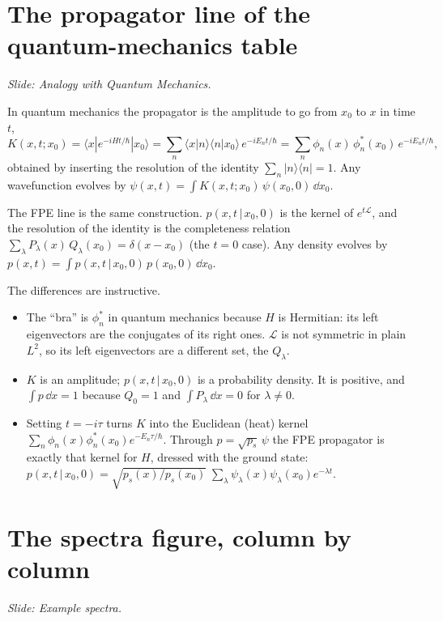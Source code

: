 \documentclass[11pt]{article}
\newcommand{\gv}{\,|\,}
\newcommand{\Lop}{\mathcal{L}}
\begin{document}
\section{The propagator line of the quantum-mechanics table}
\emph{Slide: Analogy with Quantum Mechanics.}

In quantum mechanics the propagator is the amplitude to go from $x_0$ to $x$ in time $t$,
\[
  K(x,t;x_0)=\langle x|e^{-iHt/\hbar}|x_0\rangle=\sum_n\langle x|n\rangle\langle n|x_0\rangle\,e^{-iE_nt/\hbar}
  =\sum_n\phi_n(x)\,\phi_n^*(x_0)\,e^{-iE_nt/\hbar},
\]
obtained by inserting the resolution of the identity $\sum_n|n\rangle\langle n|=1$. Any wavefunction evolves by
$\psi(x,t)=\int K(x,t;x_0)\,\psi(x_0,0)\,\dd x_0$.

The FPE line is the same construction. $p(x,t\gv x_0,0)$ is the kernel of $e^{t\Lop}$, and the resolution of the identity
is the completeness relation $\sum_\lambda P_\lambda(x)\,Q_\lambda(x_0)=\delta(x-x_0)$ (the $t=0$ case). Any density evolves
by $p(x,t)=\int p(x,t\gv x_0,0)\,p(x_0,0)\,\dd x_0$.

The differences are instructive.
\begin{itemize}
  \item The ``bra'' is $\phi_n^*$ in quantum mechanics because $H$ is Hermitian: its left eigenvectors are the conjugates of
        its right ones. $\Lop$ is not symmetric in plain $L^2$, so its left eigenvectors are a different set, the
        $Q_\lambda$.
  \item $K$ is an amplitude; $p(x,t\gv x_0,0)$ is a probability density. It is positive, and $\int p\,\dd x=1$ because
        $Q_0=1$ and $\int P_\lambda\,\dd x=0$ for $\lambda\neq0$.
  \item Setting $t=-i\tau$ turns $K$ into the Euclidean (heat) kernel $\sum_n\phi_n(x)\phi_n^*(x_0)e^{-E_n\tau/\hbar}$.
        Through $p=\sqrt{p_s}\,\psi$ the FPE propagator is exactly that kernel for $H$, dressed with the ground state:
        $p(x,t\gv x_0,0)=\sqrt{p_s(x)/p_s(x_0)}\;\sum_\lambda\psi_\lambda(x)\psi_\lambda(x_0)e^{-\lambda t}$.
\end{itemize}

\section{The spectra figure, column by column}
\emph{Slide: Example spectra.}
\end{document}
